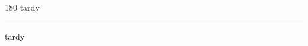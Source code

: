 
\begin{frame}
\begin{center}
\begin{turn}{180}
{\fontsize{2.5cm}{1em}\selectfont tardy}
\end{turn}
\vspace{1em}\par  
\hrule
\vspace{1em}\par  
{\fontsize{2.5cm}{1em}\selectfont tardy}
\end{center}
\end{frame}
